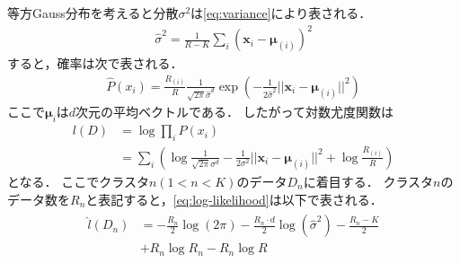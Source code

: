 等方Gauss分布を考えると分散$\sigma^2$は\eqref{eq:variance}により表される．
\begin{align}
  \label{eq:variance}
  \hat{\sigma}^2 = \frac{1}{R-K}\sum_i\left({\bm x}_i-{\bm \mu}_{(i)}\right)^2
\end{align}
すると，確率は次で表される．
\begin{align}
  \label{eq:gaussian-distribution}
  \hat{P}(x_i) = \frac{R_{(i)}}{R}\frac{1}{\sqrt{2\pi}\hat{\sigma}^d}
    \exp\left(-\frac{1}{2\hat{\sigma}^2}||{\bm x}_i-{\bm \mu}_{(i)}||^2\right)
\end{align}
ここで${\bm \mu}_{i}$は$d$次元の平均ベクトルである．
したがって対数尤度関数は
\begin{align}
  \label{eq:log-likelihood}
  l(D) &= \log \prod_i P(x_i) \\\nonumber
  &= \sum_i \left( \log\frac{1}{\sqrt{2\pi}\sigma^d}-\frac{1}{2\sigma^2}||{\bm x}_i-{\bm \mu}_{(i)}||^2 + \log\frac{R_{(i)}}{R} \right)
\end{align}
となる．
ここでクラスタ$n (1 < n < K)$のデータ$D_n$に着目する．
クラスタ$n$のデータ数を$R_n$と表記すると，\eqref{eq:log-likelihood}は以下で表される．
\begin{align}
  \begin{split}
    \hat{l}(D_n) &= -\frac{R_n}{2}\log(2\pi) - \frac{R_n \cdot d}{2}\log(\hat{\sigma}^2) -
    \frac{R_n - K}{2}\\ &
    + R_n\log R_n - R_n \log R
  \end{split}
\end{align}

